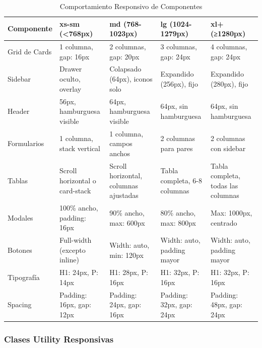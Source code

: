 \documentclass[12pt,a4paper,oneside]{article}
\begin{document}
\begin{table}[h]
\centering
\caption{Comportamiento Responsivo de Componentes}
\label{tab:componentes-responsive}
\tiny
\begin{tabular}{|l|p{2.5cm}|p{2.5cm}|p{2.5cm}|p{2.5cm}|}
\hline
\textbf{Componente} & \textbf{xs-sm (<768px)} & \textbf{md (768-1023px)} & \textbf{lg (1024-1279px)} & \textbf{xl+ (≥1280px)} \\
\hline
Grid de Cards & 1 columna, gap: 16px & 2 columnas, gap: 20px & 3 columnas, gap: 24px & 4 columnas, gap: 24px \\
\hline
Sidebar & Drawer oculto, overlay & Colapsado (64px), iconos solo & Expandido (256px), fijo & Expandido (280px), fijo \\
\hline
Header & 56px, hamburguesa visible & 64px, hamburguesa visible & 64px, sin hamburguesa & 64px, sin hamburguesa \\
\hline
Formularios & 1 columna, stack vertical & 1 columna, campos anchos & 2 columnas para pares & 2 columnas con sidebar \\
\hline
Tablas & Scroll horizontal o card-stack & Scroll horizontal, columnas ajustadas & Tabla completa, 6-8 columnas & Tabla completa, todas las columnas \\
\hline
Modales & 100\% ancho, padding: 16px & 90\% ancho, max: 600px & 80\% ancho, max: 800px & Max: 1000px, centrado \\
\hline
Botones & Full-width (excepto inline) & Width: auto, min: 120px & Width: auto, padding mayor & Width: auto, padding mayor \\
\hline
Tipografía & H1: 24px, P: 14px & H1: 28px, P: 16px & H1: 32px, P: 16px & H1: 32px, P: 16px \\
\hline
Spacing & Padding: 16px, gap: 12px & Padding: 24px, gap: 16px & Padding: 32px, gap: 24px & Padding: 48px, gap: 24px \\
\hline
\end{tabular}
\end{table}

\subsubsection{Clases Utility Responsivas}
\end{document}
